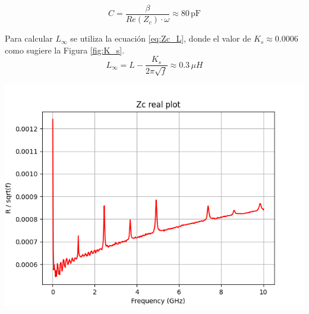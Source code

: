 \documentclass{article}   %
\theoremstyle{mytheoremstyle}
\theoremstyle{mytheoremstyle}
\theoremstyle{myproblemstyle}
\begin{document}
\begin{minipage}{0.49\textwidth}
        \begin{equation}
            C = \frac{\beta}{Re(Z_c) \cdot \omega} \approx 80 \, \text{pF}
            \label{eq:Zc_C}
        \end{equation}

        Para calcular $L_{\infty}$ se utiliza la ecuación \eqref{eq:Zc_L}, donde el valor de $K_s \approx 0.0006$ como sugiere la Figura
        \ref{fig:K_s}.
        \begin{equation}
            L_{\infty} = L - \frac{K_s}{2\pi \sqrt{f}} \approx 0.3 \, \mu H
            \label{eq:Zc_L}
        \end{equation}

        \includegraphics[width=\textwidth]{figures/ks_plot.png}
        \label{fig:K_s}


    \end{minipage}
    \hspace{0.38 cm}
\end{document}
